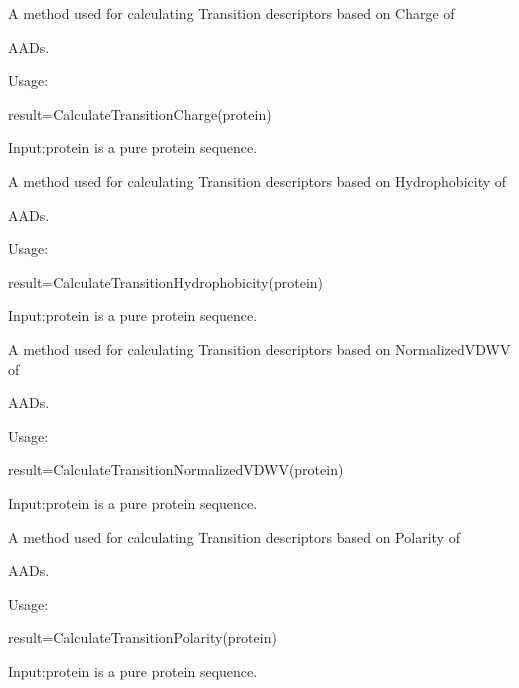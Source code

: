 \documentclass[letterpaper,10pt,english]{sphinxmanual}
\begin{document}
\begin{fulllineitems}
\label{reference/CTD:CTD.CalculateTransitionCharge}
A method used for calculating Transition descriptors based on Charge of

AADs.

Usage:

result=CalculateTransitionCharge(protein)

Input:protein is a pure protein sequence.

\end{fulllineitems}


\begin{fulllineitems}
\label{reference/CTD:CTD.CalculateTransitionHydrophobicity}
A method used for calculating Transition descriptors based on Hydrophobicity of

AADs.

Usage:

result=CalculateTransitionHydrophobicity(protein)

Input:protein is a pure protein sequence.

\end{fulllineitems}


\begin{fulllineitems}
\label{reference/CTD:CTD.CalculateTransitionNormalizedVDWV}
A method used for calculating Transition descriptors based on NormalizedVDWV of

AADs.

Usage:

result=CalculateTransitionNormalizedVDWV(protein)

Input:protein is a pure protein sequence.

\end{fulllineitems}


\begin{fulllineitems}
\label{reference/CTD:CTD.CalculateTransitionPolarity}
A method used for calculating Transition descriptors based on Polarity of

AADs.

Usage:

result=CalculateTransitionPolarity(protein)

Input:protein is a pure protein sequence.

\end{fulllineitems}
\end{document}
